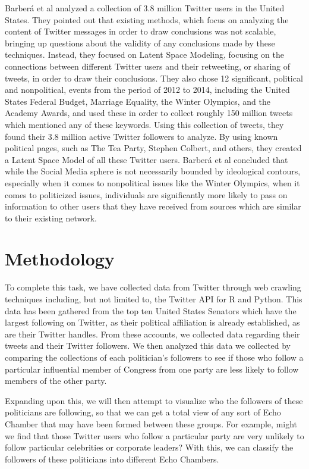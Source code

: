 \documentclass[journal]{IEEEtran}
\begin{document}
	Barberá et al analyzed a collection of 3.8 million Twitter users in the United States. They pointed out that existing methods, which focus on analyzing the content of Twitter messages in order to draw conclusions was not scalable, bringing up questions about the validity of any conclusions made by these techniques. Instead, they focused on Latent Space Modeling, focusing on the connections between different Twitter users and their retweeting, or sharing of tweets, in order to draw their conclusions. They also chose 12 significant, political and nonpolitical, events from the period of 2012 to 2014, including the United States Federal Budget, Marriage Equality, the Winter Olympics, and the Academy Awards, and used these in order to collect roughly 150 million tweets which mentioned any of these keywords. Using this collection of tweets, they found their 3.8 million active Twitter followers to analyze. By using known political pages, such as The Tea Party, Stephen Colbert, and others, they created a Latent Space Model of all these Twitter users.  Barberá et al concluded that while the Social Media sphere is not necessarily bounded by ideological contours, especially when it comes to nonpolitical issues like the Winter Olympics, when it comes to politicized issues, individuals are significantly more likely to pass on information to other users that they have received from sources which are similar to their existing network. 
	
	
	\section{Methodology}
	
	To complete this task, we have collected data from Twitter through web crawling techniques including, but not limited to, the Twitter API for R and Python. This data has been gathered from the top ten United States Senators which have the largest following on Twitter, as their political affiliation is already established, as are their Twitter handles. From these accounts, we collected data regarding their tweets and their Twitter followers. We then analyzed this data we collected by comparing the collections of each politician's followers to see if those who follow a particular influential member of Congress from one party are less likely to follow members of the other party. 
	
	Expanding upon this, we will then attempt to visualize who the followers of these politicians are following, so that we can get a total view of any sort of Echo Chamber that may have been formed between these groups. For example, might we find that those Twitter users who follow a particular party are very unlikely to follow particular celebrities or corporate leaders? With this, we can classify the followers of these politicians into different Echo Chambers. 
	
\end{document}
